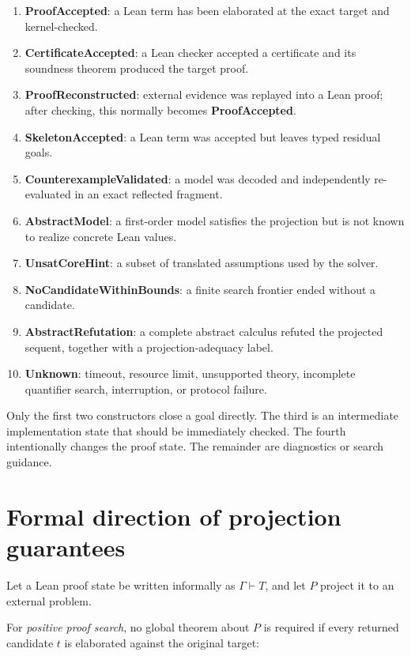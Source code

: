 \documentclass[11pt,letterpaper,openany]{report}
\newcommand{\code}[1]{\texttt{\detokenize{#1}}}
\begin{document}
\begin{enumerate}
  \item \textbf{ProofAccepted}: a Lean term has been elaborated at the exact target and
        kernel-checked.
  \item \textbf{CertificateAccepted}: a Lean checker accepted a certificate and its
        soundness theorem produced the target proof.
  \item \textbf{ProofReconstructed}: external evidence was replayed into a Lean proof;
        after checking, this normally becomes \textbf{ProofAccepted}.
  \item \textbf{SkeletonAccepted}: a Lean \code{refine} term was accepted but leaves
        typed residual goals.
  \item \textbf{CounterexampleValidated}: a model was decoded and independently
        re-evaluated in an exact reflected fragment.
  \item \textbf{AbstractModel}: a first-order model satisfies the projection but is not
        known to realize concrete Lean values.
  \item \textbf{UnsatCoreHint}: a subset of translated assumptions used by the solver.
  \item \textbf{NoCandidateWithinBounds}: a finite search frontier ended without a
        candidate.
  \item \textbf{AbstractRefutation}: a complete abstract calculus refuted the projected
        sequent, together with a projection-adequacy label.
  \item \textbf{Unknown}: timeout, resource limit, unsupported theory, incomplete
        quantifier search, interruption, or protocol failure.
\end{enumerate}

Only the first two constructors close a goal directly. The third is an intermediate
implementation state that should be immediately checked. The fourth intentionally
changes the proof state. The remainder are diagnostics or search guidance.

\section{Formal direction of projection guarantees}

Let a Lean proof state be written informally as
\(\Gamma \vdash T\), and let \(P\) project it to an external problem.

For \emph{positive proof search}, no global theorem about \(P\) is required if every
returned candidate \(t\) is elaborated against the original target:
\end{document}
